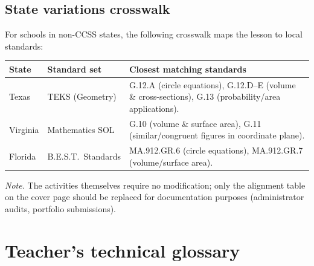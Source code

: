 \documentclass[12pt,letterpaper]{scrartcl}
\begin{document}
\subsection{State variations crosswalk}\label{ap:adapt-states}

For schools in non-CCSS states, the following crosswalk maps the lesson to local standards:

\begin{center}
\small
\begin{tabularx}{\textwidth}{@{}p{}p{}X@{}}
\toprule
\textbf{State} & \textbf{Standard set} & \textbf{Closest matching standards} \\
\midrule
Texas & TEKS (Geometry) & G.12.A (circle equations), G.12.D--E (volume \& cross-sections), G.13 (probability/area applications). \\
\addlinespace[3pt]
Virginia & Mathematics SOL & G.10 (volume \& surface area), G.11 (similar/congruent figures in coordinate plane). \\
\addlinespace[3pt]
Florida & B.E.S.T.\ Standards & MA.912.GR.6 (circle equations), MA.912.GR.7 (volume/surface area). \\
\bottomrule
\end{tabularx}
\end{center}

\textit{Note.} The activities themselves require no modification; only the alignment table on the cover page should be replaced for documentation purposes (administrator audits, portfolio submissions).

\newpage
\section{Teacher's technical glossary}\label{ap:glossary}
\end{document}
